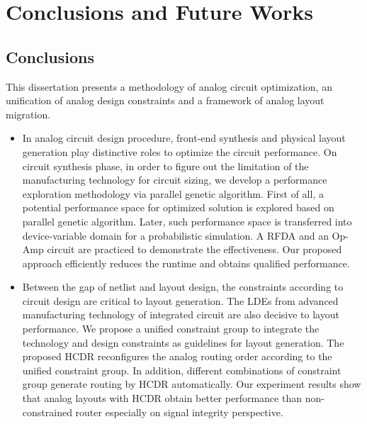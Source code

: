 
\chapter{Conclusions and Future Works}\label{chap:CFW}

  \section{Conclusions}\label{sec:Conclusion}

    This dissertation presents a methodology of analog circuit optimization, an unification of analog design constraints and a framework of analog layout migration. 

    \begin{itemize}
      \item In analog circuit design procedure, front-end synthesis and physical layout generation play distinctive roles to optimize the circuit performance. On circuit synthesis phase, in order to figure out the limitation of the manufacturing technology for circuit sizing, we develop a performance exploration methodology via parallel genetic algorithm. First of all, a potential performance space for optimized solution is explored based on parallel genetic algorithm. Later, such performance space is transferred into device-variable domain for a probabilistic simulation. A RFDA and an Op-Amp circuit are practiced to demonstrate the effectiveness. Our proposed approach efficiently reduces the runtime and obtains qualified performance. 
      \item Between the gap of netlist and layout design, the constraints according to circuit design are critical to layout generation. The LDEs from advanced manufacturing technology of integrated circuit are also decisive to layout performance. We propose a unified constraint group to integrate the technology and design constraints as guidelines for layout generation. The proposed HCDR reconfigures the analog routing order according to the unified constraint group. In addition, different combinations of constraint group generate routing by HCDR automatically. Our experiment results show that analog layouts with HCDR obtain better performance than non-constrained router especially on signal integrity perspective. 

\end{itemize}
